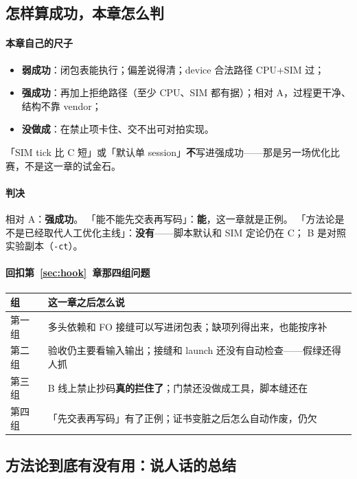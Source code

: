 \documentclass[UTF8,a4paper,11pt]{ctexart}
\theoremstyle{definition}
\theoremstyle{plain}
\theoremstyle{remark}
\numberwithin{figure}{section}
\numberwithin{table}{section}
\begin{document}
\subsection{怎样算成功，本章怎么判}
\label{sec:forward-verdict}

\paragraph{本章自己的尺子}
\begin{itemize}
  \item \textbf{弱成功}：闭包表能执行；偏差说得清；device 合法路径 CPU+SIM 过；
  \item \textbf{强成功}：再加上拒绝路径（至少 CPU、SIM 都有据）；相对 A，过程更干净、结构不靠 vendor；
  \item \textbf{没做成}：在禁止项卡住、交不出可对拍实现。
\end{itemize}
「SIM tick 比 C 短」或「默认单 session」\textbf{不}写进强成功——那是另一场优化比赛，不是这一章的试金石。

\paragraph{判决}
相对 A：\textbf{强成功}。
「能不能先交表再写码」：\textbf{能}，这一章就是正例。
「方法论是不是已经取代人工优化主线」：\textbf{没有}——脚本默认和 SIM 定论仍在 C；
B 是对照实验副本（\texttt{-ct}）。

\paragraph{回扣第~\ref{sec:hook}~章那四组问题}
\begin{center}
\small
\begin{tabular}{@{}L{2.2cm}L{11.6cm}@{}}
  \toprule
  组 & 这一章之后怎么说 \\
  \midrule
  第一组 &
  多头依赖和 FO 接缝可以写进闭包表；缺项列得出来，也能按序补 \\
  第二组 &
  验收仍主要看输入输出；接缝和 launch 还没有自动检查——假绿还得人抓 \\
  第三组 &
  B 线上禁止抄码\textbf{真的拦住了}；门禁还没做成工具，脚本缝还在 \\
  第四组 &
  「先交表再写码」有了正例；证书变脏之后怎么自动作废，仍欠 \\
  \bottomrule
\end{tabular}
\end{center}

\subsection{方法论到底有没有用：说人话的总结}
\label{sec:forward-method-effect}
\end{document}
